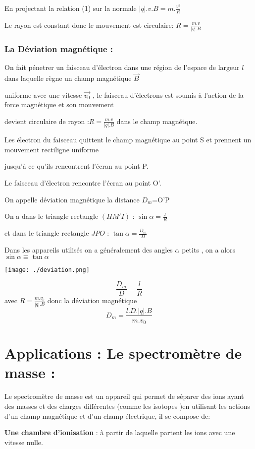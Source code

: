 \documentclass[12pt]{article}
\begin{document}
 En projectant la relation (1) sur la normale $|q|.v.B = m.\frac{v^2}{R}$

 Le rayon est constant donc le mouvement est circulaire:  $R = \frac{m.v}{|q|.B}$


 \subsubsection{La Déviation magnétique : }
On fait pénetrer un faisceau d'électron dans une région de l'espace de largeur $l$
dans laquelle règne un champ magnétique $\vec{B}$

uniforme avec une vitesse $\vec{v_0}$ , le faisceau d’électrons est soumis à l'action de la force magnétique et son mouvement

devient circulaire de rayon :$R = \frac{m.v}{|q|.B}$
dans le champ magnétque.

Les électron du faisceau quittent le champ magnétique au point S et prennent un mouvement rectiligne uniforme

jusqu'à ce qu'ils rencontrent l'écran au point P.

Le faisceau d'électron rencontre l'écran au point O'.

On appelle déviation magnétique la distance $D_m$=O'P

On a dans le triangle rectangle $(HM'I)$ : $\sin{\alpha} = \frac{l}{R}$

et dans le triangle rectangle $JPO$ : $\tan{\alpha} = \frac{D_m}{D}$

Dans les appareils utilisés on a généralement des angles $\alpha$ petits , on a alors $\sin{\alpha} \equiv \tan{\alpha} $

		\begin{center}
			\texttt{[image: ./deviation.png]}
		\end{center}


$$\frac{D_m}{D} = \frac{l}{R}$$ avec $R = \frac{m.v_0}{|q|.B}$  donc la déviation magnétique $$D_m = \frac{l.D.|q|.B}{m.v_0}$$

\section{Applications : Le spectromètre de masse : }
Le spectromètre de masse est un appareil qui permet de séparer des ions ayant des masses et des charges différentes
(comme les isotopes )en utilisant les actions d'un champ magnétique et d'un champ électrique, il se compose de:

\textbf{Une chambre d'ionisation }: à partir de laquelle partent les ions avec une vitesse nulle.
\end{document}
